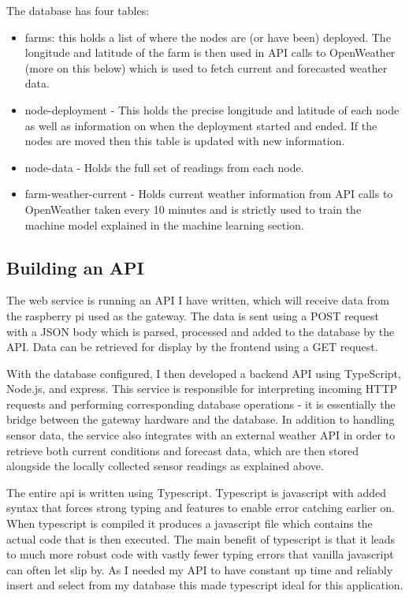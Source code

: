 The database has four tables:

\begin{itemize}     
      \item farms: this holds a list of where the nodes are (or have been)
      deployed. The longitude and latitude of the farm is then used in API calls
      to OpenWeather (more on this below) which is used to fetch current and
      forecasted weather data.
      \item node-deployment - This holds the precise longitude and latitude of
      each node as well as information on when the deployment started and ended.
      If the nodes are moved then this table is updated with new information.     
      \item node-data - Holds the full set of readings from each node.    
      \item farm-weather-current - Holds current weather information from API
      calls to OpenWeather taken every 10 minutes and is strictly used to train
      the machine model explained in the machine learning section.
 \end{itemize} 


\subsection{Building an API}

The web service is running an API I have written, which will receive data from
the raspberry pi used as the gateway. The data is sent using a POST request with
a JSON body which is parsed, processed and added to the database by the API.
Data can be retrieved for display by the frontend using a GET request.

With the database configured, I then developed a backend API using TypeScript,
Node.js, and express. This service is responsible for interpreting incoming HTTP
requests and performing corresponding database operations - it is essentially
the bridge between the gateway hardware and the database. In addition to
handling sensor data, the service also integrates with an external weather API
in order to retrieve both current conditions and forecast data, which are then
stored alongside the locally collected sensor readings as explained above.

The entire api is written using Typescript. Typescript is javascript with added
syntax that forces strong typing and features to enable error catching earlier
on. When typescript is compiled it produces a javascript file which contains the
actual code that is then executed. The main benefit of typescript is that it
leads to much more robust code with vastly fewer typing errors that vanilla
javascript can often let slip by. As I needed my API to have constant up time
and reliably insert and select from my database this made typescript ideal for
this application.

